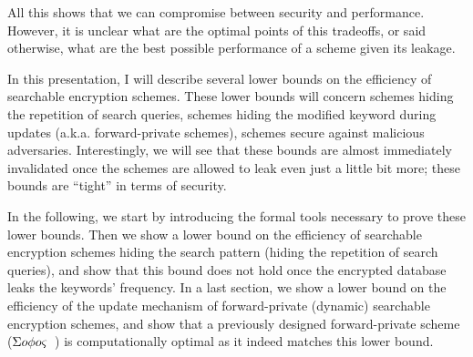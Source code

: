 All this shows that we can compromise between security and performance. 
However, it is unclear what are the optimal points of this tradeoffs, or said otherwise, what are the best possible performance of a scheme given its leakage.

\medskip

In this presentation, I will describe several lower bounds on the efficiency of searchable encryption schemes.
These lower bounds will concern schemes hiding the repetition of search queries, schemes hiding the modified keyword during updates (a.k.a. forward-private schemes), schemes secure against malicious adversaries.
Interestingly, we will see that these bounds are almost immediately invalidated once the schemes are allowed to leak even just a little bit more; these bounds are ``tight'' in terms of security. 

In the following, we start by introducing the formal tools necessary to prove these lower bounds.
Then we show a lower bound on the efficiency of searchable encryption schemes hiding the search pattern (hiding the repetition of search queries), and show that this bound does not hold once the encrypted database leaks the keywords' frequency.
In a last section, we show a lower bound on the efficiency of the update mechanism of forward-private (dynamic) searchable encryption schemes, and show that a previously designed forward-private scheme (${\Sigma o\phi o\varsigma}$~\cite{CCS:Bost16}) is computationally optimal as it indeed matches this lower bound.



